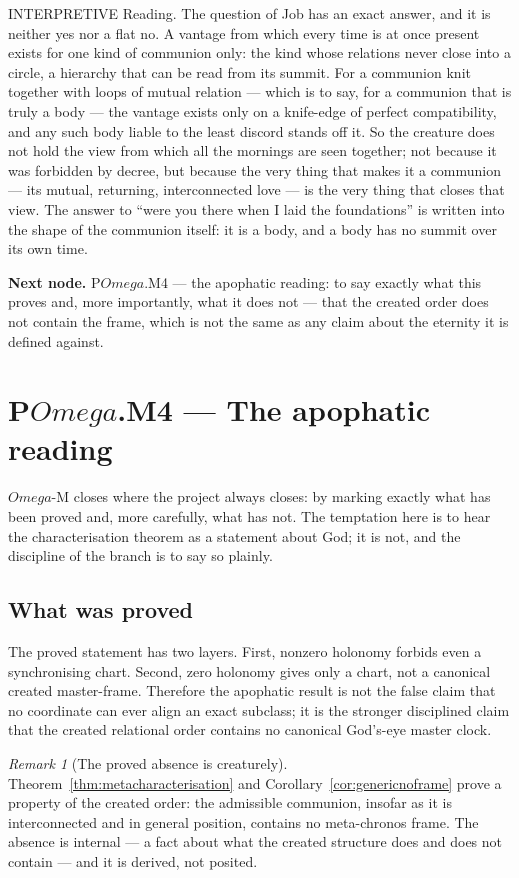 \documentclass[11pt,a4paper]{article}
\def\Omega{Omega}%
\def\emph#1{#1}%
\newcommand{\stInterp}{\textcolor{cInt}{\textsf{\small INTERPRETIVE}}}
\theoremstyle{definition}
\theoremstyle{plain}
\theoremstyle{remark}
\newtheorem{remark}[definition]{Remark}
\begin{document}
\medskip
\stInterp\quad
\emph{Reading.}
The question of Job has an exact answer, and it is neither yes nor a flat no. A vantage from
which every time is at once present exists for one kind of communion only: the kind whose
relations never close into a circle, a hierarchy that can be read from its summit. For a
communion knit together with loops of mutual relation --- which is to say, for a communion that
is truly a body --- the vantage exists only on a knife-edge of perfect compatibility, and any
such body liable to the least discord stands off it. So the creature does not hold the view
from which all the mornings are seen together; not because it was forbidden by decree, but
because the very thing that makes it a communion --- its mutual, returning, interconnected love
--- is the very thing that closes that view. The answer to ``were you there when I laid the
foundations'' is written into the shape of the communion itself: it is a body, and a body has no
summit over its own time.

\medskip
\textbf{Next node.} P$\Omega$.M4 --- the apophatic reading: to say exactly what this proves and,
more importantly, what it does not --- that the created order does not contain the frame, which
is not the same as any claim about the eternity it is defined against.

\section{P$\Omega$.M4 --- The apophatic reading}

$\Omega$-M closes where the project always closes: by marking exactly what has been proved and,
more carefully, what has not. The temptation here is to hear the characterisation theorem as a
statement about God; it is not, and the discipline of the branch is to say so plainly.

\subsection{What was proved}
The proved statement has two layers. First, nonzero holonomy forbids even a
synchronising chart. Second, zero holonomy gives only a chart, not a canonical
created master-frame. Therefore the apophatic result is not the false claim that
no coordinate can ever align an exact subclass; it is the stronger disciplined
claim that the created relational order contains no canonical God's-eye master
clock.

\begin{remark}[The proved absence is creaturely]\label{rem:metaboundary}
Theorem~\ref{thm:metacharacterisation} and Corollary~\ref{cor:genericnoframe} prove a property
\emph{of the created order}: the admissible communion, insofar as it is interconnected and in
general position, contains no meta-chronos frame. The absence is internal --- a fact about what
the created structure does and does not contain --- and it is derived, not posited.
\end{remark}
\end{document}
